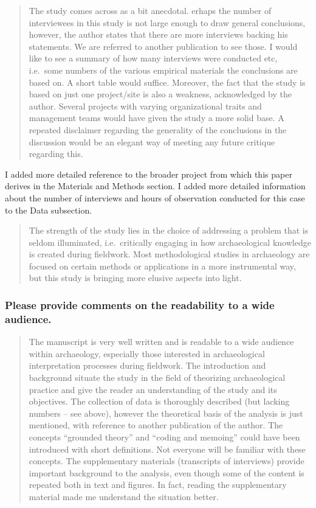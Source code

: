 \documentclass[
]{article}
\begin{document}
\begin{quote}
The study comes across as a bit anecdotal. erhaps the number of
interviewees in this study is not large enough to draw general
conclusions, however, the author states that there are more interviews
backing his statements. We are referred to another publication to see
those. I would like to see a summary of how many interviews were
conducted etc, i.e.~some numbers of the various empirical materials the
conclusions are based on. A short table would suffice. Moreover, the
fact that the study is based on just one project/site is also a
weakness, acknowledged by the author. Several projects with varying
organizational traits and management teams would have given the study a
more solid base. A repeated disclaimer regarding the generality of the
conclusions in the discussion would be an elegant way of meeting any
future critique regarding this.
\end{quote}

I added more detailed reference to the broader project from which this
paper derives in the Materials and Methods section. I added more
detailed information about the number of interviews and hours of
observation conducted for this case to the Data subsection.

\begin{quote}
The strength of the study lies in the choice of addressing a problem
that is seldom illuminated, i.e.~critically engaging in how
archaeological knowledge is created during fieldwork. Most
methodological studies in archaeology are focused on certain methods or
applications in a more instrumental way, but this study is bringing more
elusive aspects into light.
\end{quote}

\subsubsection{Please provide comments on the readability to a wide
audience.}\label{please-provide-comments-on-the-readability-to-a-wide-audience.}

\begin{quote}
The manuscript is very well written and is readable to a wide audience
within archaeology, especially those interested in archaeological
interpretation processes during fieldwork. The introduction and
background situate the study in the field of theorizing archaeological
practice and give the reader an understanding of the study and its
objectives. The collection of data is thoroughly described (but lacking
numbers -- see above), however the theoretical basis of the analysis is
just mentioned, with reference to another publication of the author. The
concepts ``grounded theory'' and ``coding and memoing'' could have been
introduced with short definitions. Not everyone will be familiar with
these concepts. The supplementary materials (transcripts of interviews)
provide important background to the analysis, even though some of the
content is repeated both in text and figures. In fact, reading the
supplementary material made me understand the situation better.
\end{quote}
\end{document}
